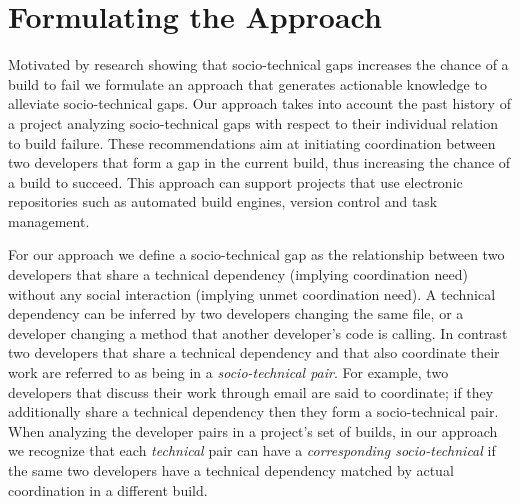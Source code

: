\documentclass[conference]{IEEEtran}
\begin{document}


%
%
%

\section{Formulating the Approach}
Motivated by research showing that socio-technical gaps increases the chance of a build to fail we formulate an approach that generates actionable knowledge to alleviate socio-technical gaps.
Our approach takes into account the past history of a project analyzing socio-technical gaps with respect to their individual relation to build failure.
These recommendations aim at initiating coordination between two developers that form a gap in the current build, thus increasing the chance of a build to succeed.
This approach can support projects that use electronic repositories such as automated build engines, version control and task management.

For our approach we define a socio-technical gap as the relationship between two developers that share a technical dependency (implying coordination need) without any social interaction (implying unmet coordination need).
A technical dependency can be inferred by two developers changing the same file, or a developer changing a method that another developer's code is calling.
In contrast two developers that share a technical dependency and that also coordinate their work are referred to as being in a \emph{socio-technical pair}.
For example, two developers that discuss their work through email are said to coordinate; if they additionally share a technical dependency then they form a socio-technical pair.
%
When analyzing the developer pairs in a project's set of builds, in our approach we recognize that each \emph{technical} pair can have a \emph{corresponding socio-technical} if the same two developers have a technical dependency matched by actual coordination in a different build. 
\end{document}
